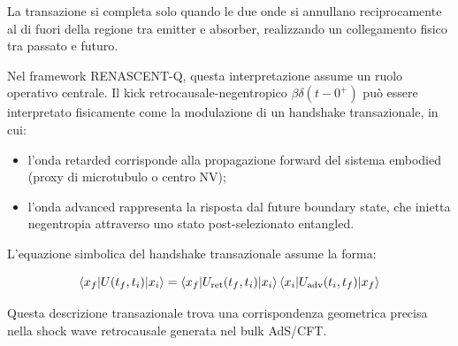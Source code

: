 \documentclass[11pt,a4paper]{article}
\theoremstyle{plain}
\theoremstyle{definition}
\begin{document}
\vspace{0.3cm}


La transazione si completa solo quando le due onde si annullano reciprocamente al di fuori della regione tra emitter e absorber, realizzando un collegamento fisico tra passato e futuro.


\vspace{0.5cm}

Nel framework RENASCENT-Q, questa interpretazione assume un ruolo operativo centrale. Il kick retrocausale-negentropico $\beta \delta(t-0^+)$ può essere interpretato fisicamente come la modulazione di un handshake transazionale, in cui:



\vspace{0.2cm}
\begin{itemize}
    \item l'onda retarded corrisponde alla propagazione forward del sistema embodied (proxy di microtubulo o centro NV);
    \item l'onda advanced rappresenta la risposta dal future boundary state, che inietta negentropia attraverso uno stato post-selezionato entangled.
\end{itemize}

\clearpage

L'equazione simbolica del handshake transazionale assume la forma:



\vspace{0.3cm}

\begin{tcolorbox}[
  colback=cyan!5!white, 
  colframe=cyan!70!black, 
  title=Handshake transazionale secondo Cramer, 
  fonttitle=\bfseries,
  breakable,
  enhanced,
  width=\textwidth,
  boxrule=0.9pt,
  arc=6pt
]
\begin{equation}
\langle x_f | U(t_f, t_i) | x_i \rangle = \langle x_f | U_{\rm ret}(t_f, t_i) | x_i \rangle \, 
\langle x_i | U_{\rm adv}(t_i, t_f) | x_f \rangle
\label{eq:transactional_handshake}
\end{equation}
\end{tcolorbox}

\vspace{0.4cm}

Questa descrizione transazionale trova una corrispondenza geometrica precisa nella shock wave retrocausale generata nel bulk AdS/CFT. 


\vspace{0.3cm}
\end{document}
